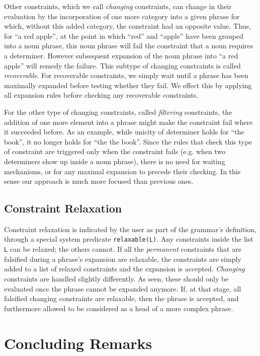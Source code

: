 \documentclass{llncs}
\begin{document}
Other constraints, which we call \emph{changing} constraints, can change in their  evaluation by the incorporation of one
more category into a given phrase for which, without this added category, the
constraint had an opposite value. Thus, for ``a red apple'',  at the point in which ``red'' and ``apple'' have been grouped into a noun phrase, this noun phrase will fail the constraint that a noun requires a determiner. However subsequent expansion of the noun phrase into ``a red apple'' will remedy the failure. This subtype of changing constraints is called \emph{recoverable}. For recoverable constraints, we simply wait until a phrase has been maximally expanded before testing whether they fail. We effect this by applying all expansion rules  before checking any recoverable constraints.

For the other type of changing constraints, called \emph{filtering} constraints, the addition of one more element into a phrase might make the constraint fail where it succeeded before. As an example, while unicity of determiner holds for ``the book'', it no longer holds for ``the the book''. Since the rules that check this type of constraint are triggered only when the constraint fails (e.g. when two determiners show up inside a noun phrase), there is no need for waiting mechanisms, or for any maximal expansion to precede their checking. In this sense our approach is much more focused than previous ones. 


\subsection{Constraint Relaxation}

Constraint relaxation is indicated by the user as part of the grammar's definition, through a special system predicate \texttt{relaxable(L)}. Any constraints inside the list \texttt{L} can be relaxed; the others cannot. If all the \emph{permanent} constraints that are falsified during a phrase's expansion are relaxable, the constraints are simply added to a list of relaxed constraints and the expansion is accepted.  \emph{Changing} constraints are handled slightly differently. As seen, these should only be evaluated once the phrase cannot be expanded anymore. If, at that stage, all falsified changing constraints are relaxable, then the phrase is accepted, and furthermore allowed to be considered as a head of a more complex phrase.


\section{Concluding Remarks}
\end{document}
